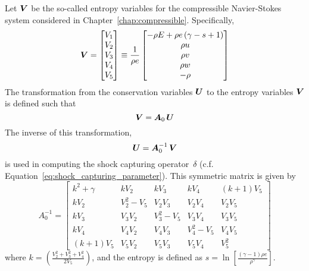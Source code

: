 Let ${\boldsymbol{V}}$ be the so-called entropy variables for the compressible Navier-Stokes system considered in Chapter~\ref{chap:compressible}. Specifically,
\begin{equation*}
  {\boldsymbol{V}} =
  \begin{bmatrix}
    V_1 \\
    V_2 \\
    V_3 \\
    V_4 \\
    V_5
  \end{bmatrix}  
  \equiv
\frac{1}{\rho e}  
  \begin{bmatrix}
    -\rho E + \rho e \left(\gamma -s + 1 \right) \\
    \rho u \\
    \rho v \\
    \rho w \\
   -\rho
  \end{bmatrix}  
\end{equation*}
The transformation from the conservation variables ${\boldsymbol{U}}$ to the entropy variables ${\boldsymbol{V}}$ is defined such that
\begin{equation*}
  {\boldsymbol{V}} = {\boldsymbol{A}}_0\,{\boldsymbol{U}} 
\end{equation*}
The inverse of this transformation,
\begin{equation*}
  {\boldsymbol{U}} = {\boldsymbol{A}}_0^{-1}\,{\boldsymbol{V}} 
\end{equation*}
 is used in computing the shock capturing operator~$\delta$ (c.f. Equation~\ref{eq:shock_capturing_parameter}).  This symmetric matrix is  given by 
\large
\begin{equation*}
  A_0^{-1} =
  \begin{bmatrix}
    k^2 + \gamma        & k V_2       & k V_3     & k V_4       &  \left(k+ 1\right)V_5 \\
    k V_2               & V_2^2 - V_5 & V_2 V_3   & V_2 V_4     &  V_2 V_5 \\
    k V_3               & V_3 V_2     & V_3^2-V_5 & V_3 V_4     &  V_3 V_5  \\ 
    k V_4               & V_4 V_2     & V_4 V_3   & V_4^2 - V_5 &  V_4 V_5  \\
    \left(k+1\right)V_5 & V_5 V_2     & V_5 V_3   & V_5 V_4     &  V_5^2
  \end{bmatrix}
\end{equation*}
\normalsize
where $k=\left(\frac{V_2^2 + V_3^2 + V_4^2}{2 V_5}\right)$, and the entropy is defined as $s=\ln \left[\frac{\left(\gamma-1\right)\rho e}{\rho^\gamma} \right]$.

